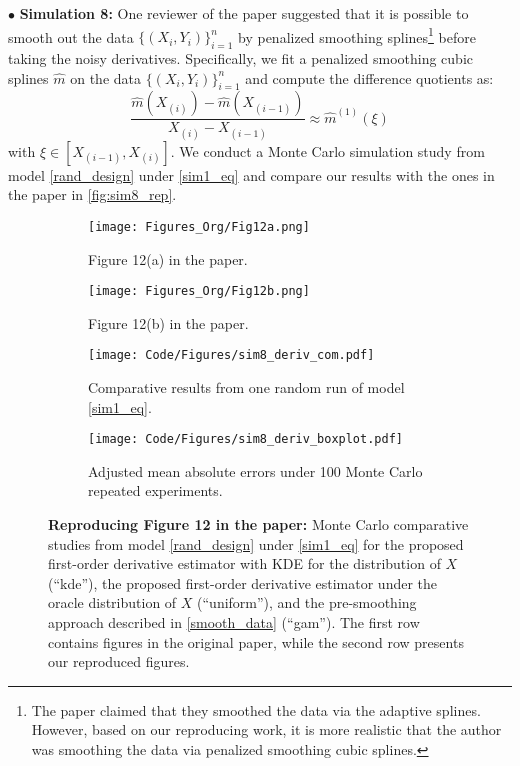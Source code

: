 \documentclass{uwstat572}
\theoremstyle{definition}
\renewcommand{\hat}{\widehat}
\theoremstyle{theorem}
\begin{document}
$\bullet$ {\bf Simulation 8:} One reviewer of the paper suggested that it is possible to smooth out the data $\{(X_i,Y_i)\}_{i=1}^n$ by penalized smoothing splines\footnote{The paper claimed that they smoothed the data via the adaptive splines. However, based on our reproducing work, it is more realistic that the author was smoothing the data via penalized smoothing cubic splines.} before taking the noisy derivatives. Specifically, we fit a penalized smoothing cubic splines $\hat{m}$ on the data $\{(X_i,Y_i)\}_{i=1}^n$ and compute the difference quotients as:
\begin{equation}
\label{smooth_data}
\frac{\hat{m}(X_{(i)}) - \hat{m}(X_{(i-1)})}{X_{(i)} - X_{(i-1)}} \approx \hat{m}^{(1)}(\xi)
\end{equation}
with $\xi \in \left[X_{(i-1)}, X_{(i)}\right]$. We conduct a Monte Carlo simulation study from model \eqref{rand_design} under \eqref{sim1_eq} and compare our results with the ones in the paper in \autoref{fig:sim8_rep}.

\begin{figure}[!t]
	\captionsetup[subfigure]{justification=centering}
	\begin{subfigure}[t]{0.49\linewidth}
		\centering
		\texttt{[image: Figures\_Org/Fig12a.png]}
		\caption{Figure 12(a) in the paper.}
	\end{subfigure}
	\hfil
	\begin{subfigure}[t]{0.49\linewidth}
		\centering
		\texttt{[image: Figures\_Org/Fig12b.png]}
		\caption{Figure 12(b) in the paper.}
	\end{subfigure}
	\begin{subfigure}[t]{0.49\linewidth}
		\centering
		\texttt{[image: Code/Figures/sim8\_deriv\_com.pdf]}
		\caption{Comparative results from one random run of model \eqref{sim1_eq}.}
	\end{subfigure}
	\hfil
	\begin{subfigure}[t]{0.49\linewidth}
		\centering
		\texttt{[image: Code/Figures/sim8\_deriv\_boxplot.pdf]}
		\caption{Adjusted mean absolute errors under 100 Monte Carlo repeated experiments.}
	\end{subfigure}
	\caption{{\bf Reproducing Figure 12 in the paper:} Monte Carlo comparative studies from model \eqref{rand_design} under \eqref{sim1_eq} for the proposed first-order derivative estimator with KDE for the distribution of $X$ (``kde''), the proposed first-order derivative estimator under the oracle distribution of $X$ (``uniform''), and the pre-smoothing approach described in \eqref{smooth_data} (``gam''). The first row contains figures in the original paper, while the second row presents our reproduced figures.}
	\label{fig:sim8_rep}
\end{figure}
\end{document}
